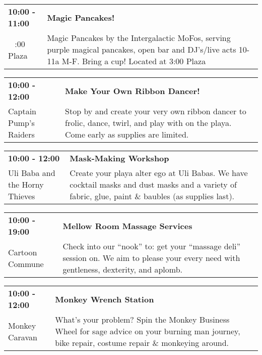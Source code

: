 \begin{tabular}{ p{1in} p{2.2in} }
    \textbf{10:00 - 11:00} & \textbf{Magic Pancakes!} \\
    ~ \newline 3:00 Plaza & Magic Pancakes by the Intergalactic MoFos, serving purple magical pancakes, open bar and DJ's/live acts 10-11a M-F. Bring a cup! Located at 3:00 Plaza \\
    \hline 
\end{tabular}
    
\begin{tabular}{ p{1in} p{2.2in} }
    \textbf{10:00 - 12:00} & \textbf{Make Your Own Ribbon Dancer!} \\
    Captain Pump's Raiders \newline  & Stop by and create your very own ribbon dancer to frolic, dance, twirl, and play with on the playa. Come early as supplies are limited. \\
    \hline 
\end{tabular}
    
\begin{tabular}{ p{1in} p{2.2in} }
    \textbf{10:00 - 12:00} & \textbf{Mask-Making Workshop} \\
    Uli Baba and the Horny Thieves \newline  & Create your playa alter ego at Uli Babas. We have cocktail masks and
dust masks and a variety of fabric, glue, paint \& baubles (as supplies
last). \\
    \hline 
\end{tabular}
    
\begin{tabular}{ p{1in} p{2.2in} }
    \textbf{10:00 - 19:00} & \textbf{Mellow Room Massage Services} \\
    Cartoon Commune \newline  & Check into our ``nook'' to: get your ``massage deli'' session on. We aim to please your every need with gentleness, dexterity, and aplomb. \\
    \hline 
\end{tabular}
    
\begin{tabular}{ p{1in} p{2.2in} }
    \textbf{10:00 - 12:00} & \textbf{Monkey Wrench Station} \\
    Monkey Caravan \newline  & What's your problem? Spin the Monkey Business Wheel for sage advice on your burning man journey, bike repair, costume repair \& monkeying around. \\
    \hline 
\end{tabular}
    
